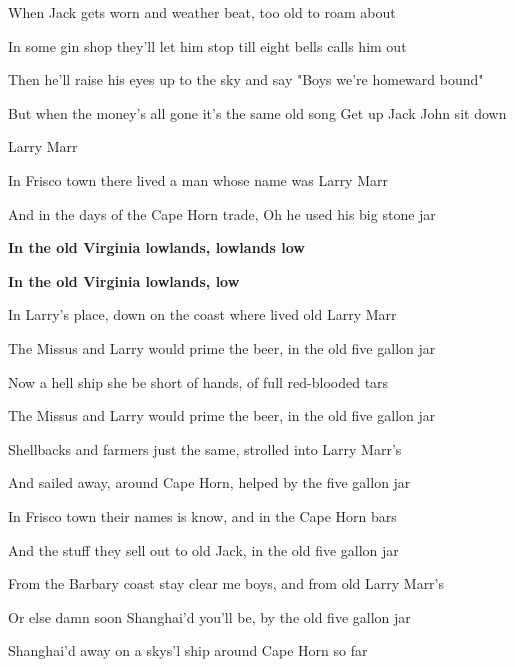 \documentclass[letterpaper,9pt]{article}
\begin{document}
\hfill

When Jack gets worn and weather beat, too old to roam about

In some gin shop they'll let him stop till eight bells calls him out

Then he'll raise his eyes up to the sky and say "Boys we're homeward bound"

But when the money's all gone it's the same old song Get up Jack John sit down

\newpage
{}
\huge
Larry Marr

\LARGE

\hfill

In Frisco town there lived a man whose name was Larry Marr

And in the days of the Cape Horn trade, Oh he used his big stone jar

\hfill

\textbf{In the old Virginia lowlands, lowlands low
}

\textbf{In the old Virginia lowlands, low}

\hfill

In Larry's place, down on the coast where lived old Larry Marr

The Missus and Larry would prime the beer, in the old five gallon jar

\hfill

Now a hell ship she be short of hands, of full red-blooded tars

The Missus and Larry would prime the beer, in the old five gallon jar

\hfill

Shellbacks and farmers just the same, strolled into Larry Marr's

And sailed away, around Cape Horn, helped by the five gallon jar

\hfill

In Frisco town their names is know, and in the Cape Horn bars

And the stuff they sell out to old Jack, in the old five gallon jar

\hfill

From the Barbary coast stay clear me boys, and from old Larry Marr's

Or else damn soon Shanghai'd you'll be, by the old five gallon jar

\hfill

Shanghai'd away on a skys'l ship around Cape Horn so far
\end{document}
